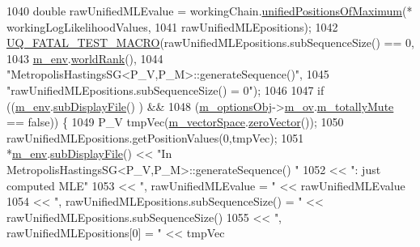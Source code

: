 \begin{DoxyCode}
1040       \textcolor{keywordtype}{double} rawUnifiedMLEvalue = workingChain.\hyperlink{class_q_u_e_s_o_1_1_base_vector_sequence_a4269482101b2bcdb1975543f8191ab4c}{unifiedPositionsOfMaximum}(*
      workingLogLikelihoodValues,
1041                                                                          rawUnifiedMLEpositions);
1042       \hyperlink{_defines_8h_a56d63d18d0a6d45757de47fcc06f574d}{UQ\_FATAL\_TEST\_MACRO}(rawUnifiedMLEpositions.subSequenceSize() == 0,
1043                           \hyperlink{class_q_u_e_s_o_1_1_metropolis_hastings_s_g_ac8ea061e55b920e0c8f9bce5c3f20e52}{m\_env}.\hyperlink{class_q_u_e_s_o_1_1_base_environment_a78b57112bbd0e6dd0e8afec00b40ffa7}{worldRank}(),
1044                           \textcolor{stringliteral}{"MetropolisHastingsSG<P\_V,P\_M>::generateSequence()"},
1045                           \textcolor{stringliteral}{"rawUnifiedMLEpositions.subSequenceSize() = 0"});
1046 
1047       \textcolor{keywordflow}{if} ((\hyperlink{class_q_u_e_s_o_1_1_metropolis_hastings_s_g_ac8ea061e55b920e0c8f9bce5c3f20e52}{m\_env}.\hyperlink{class_q_u_e_s_o_1_1_base_environment_a8a0064746ae8dddfece4229b9ad374d6}{subDisplayFile}()                   ) &&
1048           (\hyperlink{class_q_u_e_s_o_1_1_metropolis_hastings_s_g_a5d0bc9f73d50d272aa6bfb5ef5939ef3}{m\_optionsObj}->\hyperlink{class_q_u_e_s_o_1_1_metropolis_hastings_s_g_options_a9d4792d9fc2dc5439b8ab489b0c236eb}{m\_ov}.\hyperlink{class_q_u_e_s_o_1_1_mh_options_values_af812309e81191e88dfdc87c5815141a3}{m\_totallyMute} == \textcolor{keyword}{false})) \{
1049         P\_V tmpVec(\hyperlink{class_q_u_e_s_o_1_1_metropolis_hastings_s_g_a2ef17fbfc6a156f03bbfad044b5a75f5}{m\_vectorSpace}.\hyperlink{class_q_u_e_s_o_1_1_vector_space_a92e963bb5cab3eecd290dfe4b8f03b04}{zeroVector}());
1050         rawUnifiedMLEpositions.getPositionValues(0,tmpVec);
1051         *\hyperlink{class_q_u_e_s_o_1_1_metropolis_hastings_s_g_ac8ea061e55b920e0c8f9bce5c3f20e52}{m\_env}.\hyperlink{class_q_u_e_s_o_1_1_base_environment_a8a0064746ae8dddfece4229b9ad374d6}{subDisplayFile}() << \textcolor{stringliteral}{"In MetropolisHastingsSG<P\_V,P\_M>::generateSequence()
      "}
1052                                 << \textcolor{stringliteral}{": just computed MLE"}
1053                                 << \textcolor{stringliteral}{", rawUnifiedMLEvalue = "}                       << rawUnifiedMLEvalue
1054                                 << \textcolor{stringliteral}{", rawUnifiedMLEpositions.subSequenceSize() = "} << 
      rawUnifiedMLEpositions.subSequenceSize()
1055                                 << \textcolor{stringliteral}{", rawUnifiedMLEpositions[0] = "}                << tmpVec

\end{DoxyCode}
